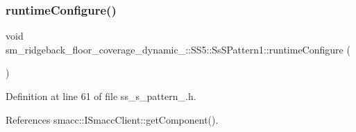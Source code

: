 \subsubsection{\texorpdfstring{runtime\+Configure()}{runtimeConfigure()}}
{\footnotesize\ttfamily void sm\+\_\+ridgeback\+\_\+floor\+\_\+coverage\+\_\+dynamic\+\_\+::\+S\+S5\+::\+Ss\+S\+Pattern1\+::runtime\+Configure (\begin{DoxyParamCaption}{ }\end{DoxyParamCaption})\hspace{0.3cm}{\ttfamily [inline]}}



Definition at line 61 of file ss\+\_\+s\+\_\+pattern\+\_.\+h.



References smacc\+::\+I\+Smacc\+Client\+::get\+Component().


